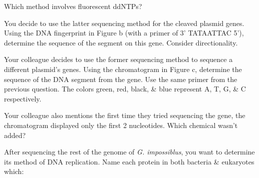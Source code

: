 \documentclass[addpoints]{exam}
\begin{document}
\begin{questions}
\question[1] Which method involves fluorescent ddNTPs? 


\question[4] You decide to use the latter sequencing method for the cleaved plasmid genes. Using the DNA fingerprint in Figure b (with a primer of 3’ TATAATTAC 5’), determine the sequence of the segment on this gene. Consider directionality. \fillin[3’ TATAATTACTCGAAGTCAG 5’][0pt]

\question[4] Your colleague decides to use the former sequencing method to sequence a different plasmid’s genes. Using the chromatogram in Figure c, determine the sequence of the DNA segment from the gene. Use the same primer from the previous question. The colors green, red, black, \& blue represent A, T, G, \& C respectively. \fillin[3’ TATAATTACATGCTTCGGCAAGACTCAAA 5’][0pt]

\question[2] Your colleague also mentions the first time they tried sequencing the gene, the chromatogram displayed only the first 2 nucleotides. Which chemical wasn’t added? 

\newpage


\question After sequencing the rest of the genome of \textit{G. impossiblus}, you want to determine its method of DNA replication. Name each protein in both bacteria \& eukaryotes which:

\end{questions}
\end{document}
